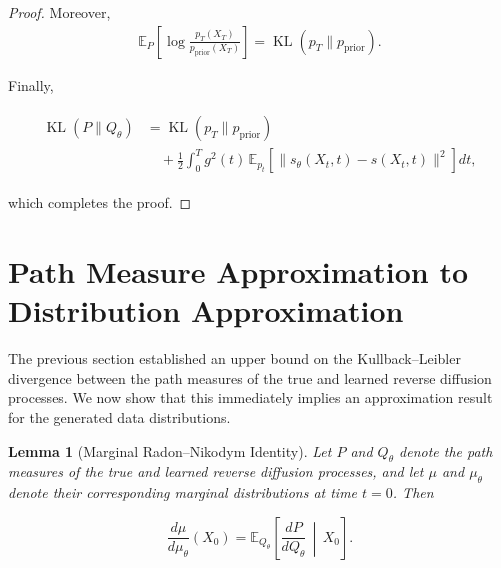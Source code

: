 \documentclass[11pt]{article}
\newtheorem{lemma}{Lemma}
\DeclareMathOperator{\KL}{KL}
\begin{document}
\begin{proof}
Moreover,
\begin{align}
\mathbb{E}_P
\!\left[
\log
\frac{
p_T(X_T)
}{
p_{\mathrm{prior}}(X_T)
}
\right]
=
\KL(p_T\|p_{\mathrm{prior}}).
\end{align}

Finally,

\begin{align}
\begin{aligned}
\KL(P\|Q_\theta)
&=
\KL(p_T\|p_{\mathrm{prior}})
\\
&\quad+
\frac12
\int_0^T
g^2(t)
\,
\mathbb{E}_{p_t}
\!\left[
\|s_\theta(X_t,t)-s(X_t,t)\|^2
\right]
dt,
\end{aligned}
\end{align}

which completes the proof.

\end{proof}


\section{Path Measure Approximation to Distribution Approximation}

The previous section established an upper bound on the Kullback--Leibler
divergence between the path measures of the true and learned reverse diffusion
processes. We now show that this immediately implies an approximation result
for the generated data distributions.

\begin{lemma}[Marginal Radon--Nikodym Identity]
\label{lem:marginal-rn}
Let $P$ and $Q_\theta$ denote the path measures of the true and learned
reverse diffusion processes, and let $\mu$ and $\mu_\theta$ denote their
corresponding marginal distributions at time $t=0$. Then

\[
\boxed{
\frac{d\mu}{d\mu_\theta}(X_0)
=
\mathbb E_{Q_\theta}
\left[
\frac{dP}{dQ_\theta}
\,\middle|\,
X_0
\right].
}
\]

\end{lemma}
\end{document}
